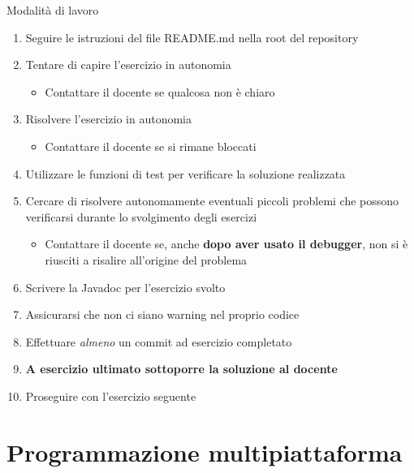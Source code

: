 \documentclass[presentation]{beamer}
\begin{document}
\begin{frame}{Modalità di lavoro}
	\begin{enumerate}
		\item Seguire le istruzioni del file README.md nella root del repository
		\item Tentare di capire l'esercizio in autonomia
		\begin{itemize}
			\item Contattare il docente se qualcosa non è chiaro
		\end{itemize}
		\item Risolvere l'esercizio in autonomia
		\begin{itemize}
			\item Contattare il docente se si rimane bloccati
		\end{itemize}
		\item Utilizzare le funzioni di test per verificare la soluzione realizzata
		\item Cercare di risolvere autonomamente eventuali piccoli problemi che possono verificarsi durante lo svolgimento degli esercizi
		\begin{itemize}
			\item Contattare il docente se, anche \textbf{dopo aver usato il debugger}, non si è riusciti a risalire all'origine del problema
		\end{itemize}
		\item Scrivere la Javadoc per l'esercizio svolto
		\item \alert{Assicurarsi che non ci siano warning nel proprio codice}
		\item Effettuare \textit{almeno} un commit ad esercizio completato
		\item \textbf{A esercizio ultimato sottoporre la soluzione al docente}
		\item Proseguire con l'esercizio seguente
	\end{enumerate}
\end{frame}

\section{Programmazione multipiattaforma}
\end{document}

